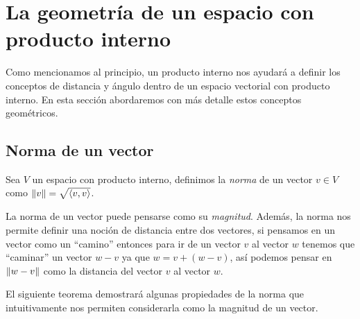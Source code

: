 \section{La geometría de un espacio con producto interno}

Como mencionamos al principio, un producto interno nos ayudará a definir los conceptos de distancia y ángulo dentro de un espacio vectorial con producto interno. En esta sección abordaremos con más detalle estos conceptos geométricos.


\subsection{Norma de un vector}

\begin{defi}
  Sea $V$ un espacio con producto interno, definimos la \emph{norma} de un vector $v \in V$ como $\mathopen\|v\mathclose\| = \sqrt{\langle v,v\rangle}$.
\end{defi}

La norma de un vector puede pensarse como su \emph{magnitud}. Además, la norma nos permite definir una noción de distancia entre dos vectores, si pensamos en un vector como un ``camino'' entonces para ir de un vector $v$ al vector $w$ tenemos que ``caminar'' un vector $w-v$ ya que $w = v + (w-v)$, así podemos pensar en $\mathopen\|w-v\mathclose\|$ como la distancia del vector $v$ al vector $w$.

El siguiente teorema demostrará algunas propiedades de la norma que intuitivamente nos permiten considerarla como la magnitud de un vector.

